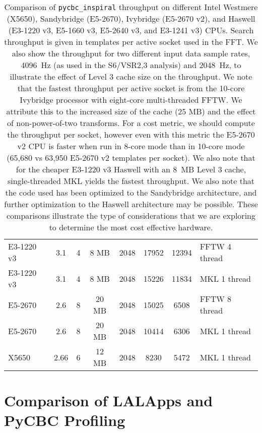 \begin{table}[!t]
\begin{center}
{\begin{tabular}{|l|c|c|c|c|c|c|l|}
E3-1220 v3  & 3.1 & 4          & 8 MB          & 2048          & 17952 & 12394 & FFTW 4 thread      \\
E3-1220 v3  & 3.1 & 4          & 8 MB          & 2048          & 15226 & 11834 & MKL 1 thread       \\
E5-2670     & 2.6 & 8          & 20 MB         & 2048          & 15025 &  6508 & FFTW 8 thread      \\
E5-2670     & 2.6 & 8          & 20 MB         & 2048          & 10414 &  6306 & MKL 1 thread       \\
X5650       & 2.66 & 6          & 12 MB         & 2048          &  8230 &  5472 & MKL 1 thread       \\\hline
\end{tabular}  
}
\caption{%
\label{tab:cpu-trade-study}
Comparison of \texttt{pycbc\_inspiral} throughput on different Intel Westmere
(X5650), Sandybridge (E5-2670), Ivybridge (E5-2670 v2), and Haswell (E3-1220 v3,
E5-1660 v3, E5-2640 v3, and E3-1241 v3)
CPUs. Search throughput is given in templates per active socket used in the
FFT. We also show the throughput for two different input data sample rates,
4096~Hz (as used in the S6/VSR2,3 analysis) and 2048~Hz, to illustrate the
effect of Level 3 cache size on the throughput. We note that the fastest
throughput per active socket is from the 10-core Ivybridge processor with 
eight-core multi-threaded FFTW. We attribute this to the increased size of the
cache (25 MB) and the effect of non-power-of-two transforms. For a cost
metric, we should compute the throughput per socket, however even with this
metric the E5-2670 v2 CPU is faster when run in 8-core mode than in 10-core
mode (65,680 vs 63,950 E5-2670 v2 templates per socket). We also note that for
the cheaper E3-1220 v3 Haswell with an 8~MB Level 3 cache, single-threaded MKL yields the fastest throughput. 
 We also note that the code used has been optimized to the Sandybridge
architecture, and further optimization to the Haswell architecture may be
possible.
These comparisons illustrate the type of
considerations that we are exploring to determine the most cost effective
hardware.
}
\end{center}
\end{table}


\appendix

\vspace*{-10pt}
\section{Comparison of LALApps and PyCBC Profiling}
\vspace*{-05pt}
\label{a:lalapps}

